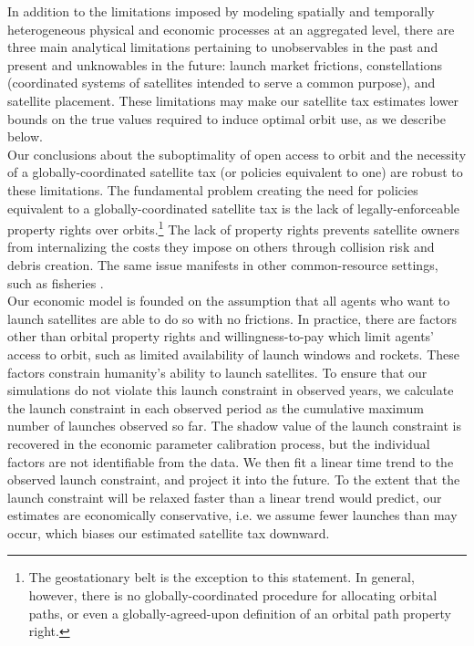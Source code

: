 \documentclass[12pt]{article}
\begin{document}
In addition to the limitations imposed by modeling spatially and temporally heterogeneous physical and economic processes at an aggregated level, there are three main analytical limitations pertaining to unobservables in the past and present and unknowables in the future: launch market frictions, constellations (coordinated systems of satellites intended to serve a common purpose), and satellite placement. These limitations may make our satellite tax estimates lower bounds on the true values required to induce optimal orbit use, as we describe below.\\ 

Our conclusions about the suboptimality of open access to orbit and the necessity of a globally-coordinated satellite tax (or policies equivalent to one) are robust to these limitations.  The fundamental problem creating the need for policies equivalent to a globally-coordinated satellite tax is the lack of legally-enforceable property rights over orbits.\footnote{The geostationary belt is the exception to this statement. In general, however, there is no globally-coordinated procedure for allocating orbital paths, or even a globally-agreed-upon definition of an orbital path property right.} The lack of property rights prevents satellite owners from internalizing the costs they impose on others through collision risk and debris creation. The same issue manifests in other common-resource settings, such as fisheries \cite{gordon1954}. \\

Our economic model is founded on the assumption that all agents who want to launch satellites are able to do so with no frictions. In practice, there are factors other than orbital property rights and willingness-to-pay which limit agents' access to orbit, such as limited availability of launch windows and rockets. These factors constrain humanity's ability to launch satellites. To ensure that our simulations do not violate this launch constraint in observed years, we calculate the launch constraint in each observed period as the cumulative maximum number of launches observed so far. The shadow value of the launch constraint is recovered in the economic parameter calibration process, but the individual factors are not identifiable from the data. We then fit a linear time trend to the observed launch constraint, and project it into the future. To the extent that the launch constraint will be relaxed faster than a linear trend would predict, our estimates are economically conservative, i.e. we assume fewer launches than may occur, which biases our estimated satellite tax downward. \\
\end{document}
